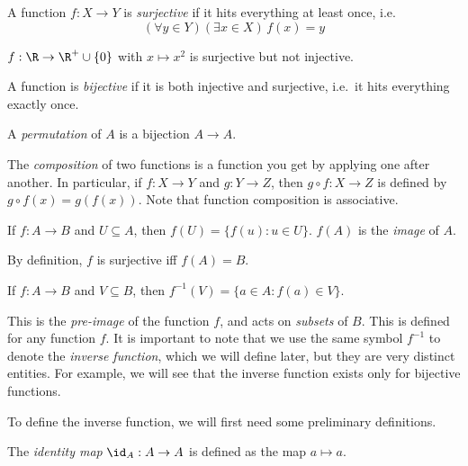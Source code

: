\documentclass[a4paper]{article}
\begin{document}
\begin{defi}
  A function $f: X \to Y$ is \emph{surjective} if it hits everything at least once, i.e.
  \[
    (\forall y\in Y)(\exists x\in X)\,f(x) = y
  \]
\end{defi}

\begin{eg}
  $f: \R \to\R^+\cup\{0\}$ with $x \mapsto x^2$ is surjective but not injective.
\end{eg}

\begin{defi}
  A function is \emph{bijective} if it is both injective and surjective, i.e.\ it hits everything exactly once.
\end{defi}

\begin{defi}[Permutation]
  A \emph{permutation} of $A$ is a bijection $A\to A$.
\end{defi}

\begin{defi}
  The \emph{composition} of two functions is a function you get by applying one after another. In particular, if $f: X \rightarrow Y$ and $g: Y\rightarrow Z$, then $g\circ f: X \rightarrow Z$ is defined by $g\circ f(x) = g(f(x))$. Note that function composition is associative.
\end{defi}

\begin{defi}
  If $f: A\to B$ and $U\subseteq A$, then $f(U) = \{f(u):u\in U\}$. $f(A)$ is the \emph{image} of $A$.
\end{defi}
By definition, $f$ is surjective iff $f(A) = B$.

\begin{defi}
  If $f: A\to B$ and $V\subseteq B$, then $f^{-1}(V) = \{a\in A: f(a)\in V\}$.
\end{defi}
This is the \emph{pre-image} of the function $f$, and acts on \emph{subsets} of $B$. This is defined for any function $f$. It is important to note that we use the same symbol $f^{-1}$ to denote the \emph{inverse function}, which we will define later, but they are very distinct entities. For example, we will see that the inverse function exists only for bijective functions.

To define the inverse function, we will first need some preliminary definitions.

\begin{defi}
  The \emph{identity map} $\id _A: A\to A$ is defined as the map $a\mapsto a$.
\end{defi}
\end{document}
